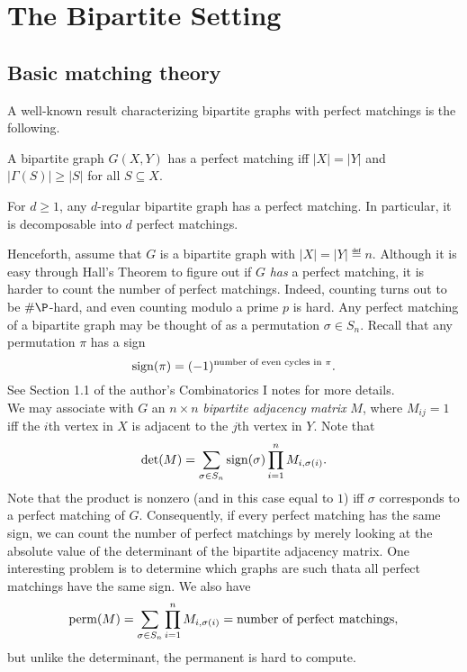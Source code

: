 
\section{The Bipartite Setting}


\subsection{Basic matching theory}

A well-known result characterizing bipartite graphs with perfect matchings is the following.

\begin{ftheo}
	A bipartite graph $G(X,Y)$ has a perfect matching iff $|X|=|Y|$ and $|\Gamma(S)| \ge |S|$ for all $S \subseteq X$.
\end{ftheo}

\begin{fcor}
	For $d \ge 1$, any $d$-regular bipartite graph has a perfect matching. In particular, it is decomposable into $d$ perfect matchings.
\end{fcor}

Henceforth, assume that $G$ is a bipartite graph with $|X|=|Y|\eqdef n$. Although it is easy through Hall's Theorem to figure out if $G$ \emph{has} a perfect matching, it is harder to count the number of perfect matchings. Indeed, counting turns out to be $\#\P$-hard, and even counting modulo a prime $p$ is hard. Any perfect matching of a bipartite graph may be thought of as a permutation $\sigma \in S_n$. Recall that any permutation $\pi$ has a sign
\[ \operatorname{sign}(\pi) = (-1)^{\text{number of even cycles in $\pi$}}. \]
See Section 1.1 of the author's Combinatorics I notes for more details.\\

We may associate with $G$ an $n \times n$ \emph{bipartite adjacency matrix} $M$, where $M_{ij} = 1$ iff the $i$th vertex in $X$ is adjacent to the $j$th vertex in $Y$. Note that
\[ \det(M) = \sum_{\sigma \in S_n} \operatorname{sign}(\sigma) \prod_{i=1}^n M_{i,\sigma(i)}. \]
Note that the product is nonzero (and in this case equal to $1$) iff $\sigma$ corresponds to a perfect matching of $G$. Consequently, if every perfect matching has the same sign, we can count the number of perfect matchings by merely looking at the absolute value of the determinant of the bipartite adjacency matrix. One interesting problem is to determine which graphs are such thata all perfect matchings have the same sign. We also have
\[ \operatorname{perm}(M) = \sum_{\sigma \in S_n} \prod_{i=1}^n M_{i,\sigma(i)} = \text{number of perfect matchings}, \]
but unlike the determinant, the permanent is hard to compute.\\

